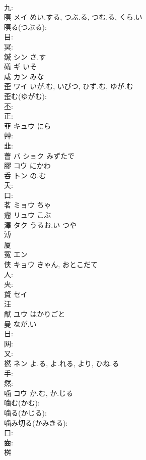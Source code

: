 \documentclass[8pt]{extreport}
\begin{document}
\begin{CJK}{UTF8}{min}
\\	九: 
\\	瞑	メイ	めい.する, つぶ.る, つむ.る, くら.い		
\\	瞑る(つぶる): 
\\	目: 
\\	冥: 
\\	鍼	シン さ.す			
\\	礒	ギ いそ			
\\	咸	カン みな			
\\	歪	ワイ	いが.む, いびつ, ひず.む, ゆが.む		
\\	歪む(ゆがむ): 
\\	丕: 
\\	正: 
\\	韮	キュウ	にら		
\\	艸: 
\\	韭: 
\\	薔	バ ショク みずたで			
\\	膠	コウ にかわ			
\\	呑	トン	の.む		
\\	夭: 
\\	口: 
\\	茗	ミョウ ちゃ			
\\	瘤	リュウ こぶ			
\\	澤	タク うるお.い つや			
\\	溥						
\\	厦						
\\	冤	エン			
\\	侠	キョウ	きゃん, おとこだて		
\\	人: 
\\	夾: 
\\	贅	セイ			
\\	汪						
\\	猷	ユウ はかりごと					
\\	曼		なが.い				
\\	日: 
\\	网: 
\\	又: 
\\	撚	ネン	よ.る, よ.れる, より, ひね.る		
\\	手: 
\\	然: 
\\	噛	コウ	か.む, か.じる		
\\	噛む(かむ): 
\\	噛る(かじる): 
\\	噛み切る(かみきる): 
\\	口: 
\\	齒: 
\\	桝						

\end{CJK}
\end{document}
